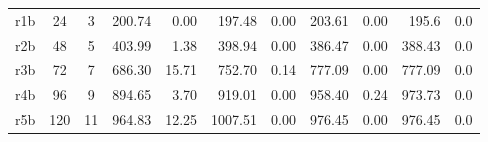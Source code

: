 \begin{landscape}
\begin{table}[]
\begin{tabular}{cllrrrrrrrr}
  r1b                  & \multicolumn{1}{c}{24}  & \multicolumn{1}{c}{3}   & 200.74                       & 0.00                      & 197.48                       & 0.00                        & 203.61                        & 0.00                       & 195.6                        & 0.0
                           \\
  r2b                  & \multicolumn{1}{c}{48}  & \multicolumn{1}{c}{5}   & 403.99                        & 1.38                         & 398.94                        & 0.00                        & 386.47                        & 0.00                        & 388.43                        & 0.0                         \\
  r3b                  & \multicolumn{1}{c}{72}  & \multicolumn{1}{c}{7}   & 686.30                & 15.71                        & 752.70                        & 0.14                         & 777.09                        & 0.00                        & 777.09                        & 0.0                         \\
  r4b                  & \multicolumn{1}{c}{96}  & \multicolumn{1}{c}{9}   & 894.65                     & 3.70                    & 919.01                        & 0.00                        & 958.40                        & 0.24                         & 973.73                        & 0.0                         \\
  r5b                  & \multicolumn{1}{c}{120}  & \multicolumn{1}{c}{11}   & 964.83                      & 12.25                         & 1007.51                        & 0.00                       & 976.45                        & 0.00                        & 976.45                       & 0.0                         \\ \hline
  \end{tabular}
  \end{table}
\end{landscape}




